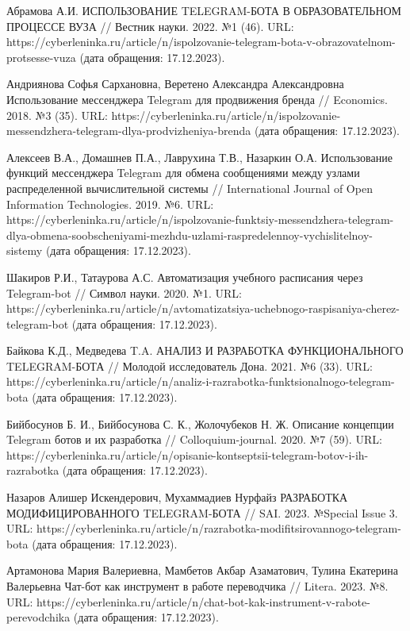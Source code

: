 \documentclass{article}
\begin{document}
Абрамова А.И. ИСПОЛЬЗОВАНИЕ TELEGRAM-БОТА В ОБРАЗОВАТЕЛЬНОМ ПРОЦЕССЕ ВУЗА // Вестник науки. 2022. №1 (46). URL: https://cyberleninka.ru/article/n/ispolzovanie-telegram-bota-v-obrazovatelnom-protsesse-vuza (дата обращения: 17.12.2023).

Андриянова Софья Сархановна, Веретено Александра Александровна Использование мессенджера Telegram для продвижения бренда // Economics. 2018. №3 (35). URL: https://cyberleninka.ru/article/n/ispolzovanie-messendzhera-telegram-dlya-prodvizheniya-brenda (дата обращения: 17.12.2023).

Алексеев В.А., Домашнев П.А., Лаврухина Т.В., Назаркин О.А. Использование функций мессенджера Telegram для обмена сообщениями между узлами распределенной вычислительной системы // International Journal of Open Information Technologies. 2019. №6. URL: https://cyberleninka.ru/article/n/ispolzovanie-funktsiy-messendzhera-telegram-dlya-obmena-soobscheniyami-mezhdu-uzlami-raspredelennoy-vychislitelnoy-sistemy (дата обращения: 17.12.2023).

Шакиров Р.И., Татаурова А.С. Автоматизация учебного расписания через Telegram-bot // Символ науки. 2020. №1. URL: https://cyberleninka.ru/article/n/avtomatizatsiya-uchebnogo-raspisaniya-cherez-telegram-bot (дата обращения: 17.12.2023).

Байкова К.Д., Медведева T.A. АНАЛИЗ И РАЗРАБОТКА ФУНКЦИОНАЛЬНОГО TELEGRAM-БОТА // Молодой исследователь Дона. 2021. №6 (33). URL: https://cyberleninka.ru/article/n/analiz-i-razrabotka-funktsionalnogo-telegram-bota (дата обращения: 17.12.2023).

Бийбосунов Б. И., Бийбосунова С. К., Жолочубеков Н. Ж. Описание концепции Telegram ботов и их разработка // Colloquium-journal. 2020. №7 (59). URL: https://cyberleninka.ru/article/n/opisanie-kontseptsii-telegram-botov-i-ih-razrabotka (дата обращения: 17.12.2023).

Назаров Алишер Искендерович, Мухаммадиев Нурфайз РАЗРАБОТКА МОДИФИЦИРОВАННОГО TELEGRAM-БОТА // SAI. 2023. №Special Issue 3. URL: https://cyberleninka.ru/article/n/razrabotka-modifitsirovannogo-telegram-bota (дата обращения: 17.12.2023).

Артамонова Мария Валериевна, Мамбетов Акбар Азаматович, Тулина Екатерина Валерьевна Чат-бот как инструмент в работе переводчика // Litera. 2023. №8. URL: https://cyberleninka.ru/article/n/chat-bot-kak-instrument-v-rabote-perevodchika (дата обращения: 17.12.2023).
\end{document}
